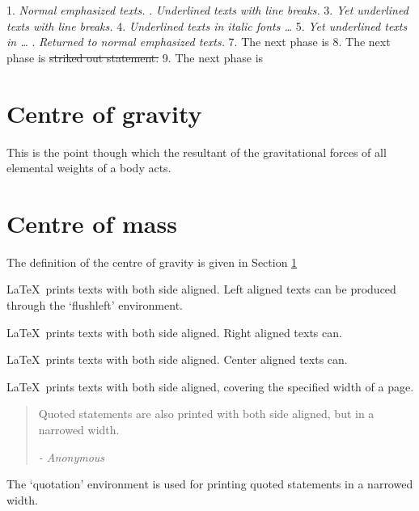 \documentclass[11pt,a4paper]{article}
\begin{document}
    1. {\em Normal emphasized texts.}
    . {\em Underlined texts with line breaks.}
    3. \emph{Yet underlined texts with line breaks.}
    4. {\it{\em Underlined texts in italic fonts …}}
    5. \textit{\emph{Yet underlined texts in …}}
    . {\em Returned to normal emphasized texts.}
    7. The next phase is 
    8. The next phase is \sout{striked out statement.}
    9. The next phase is 
    
\section{Centre of gravity}\label{sec:cg}
    This is the point though which the resultant
    of the gravitational forces of all elemental
    weights of a body acts.
%
    \section{Centre of mass}\label{sec-ex}
    The definition of the centre of gravity is
    given in Section \ref{sec:cg}
    
\begin{flushleft}
    \LaTeX\ prints texts with both side aligned.
    Left aligned texts can be produced through
    the ‘flushleft’ environment.
    \end{flushleft}
    \begin{flushright}
        \LaTeX\ prints texts with both side aligned.
        Right aligned texts can.
    \end{flushright}
    \begin{center}
        \LaTeX\ prints texts with both side aligned.
        Center aligned texts can.
    \end{center}
    
LaTeX\ prints texts with both side aligned,
    covering the specified width of a page.
    \begin{quotation}
        \begin{spacing}{1.2}
            Quoted statements are also printed with both side
            aligned, but in a narrowed width.
            \begin{flushright}
                {\it - Anonymous}
            \end{flushright}
        \end{spacing}
    \end{quotation}
    The ‘quotation’ environment is used for printing
    quoted statements in a narrowed width.
    
\end{document}
